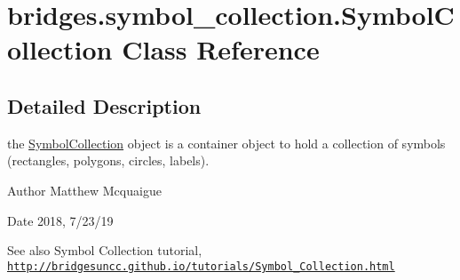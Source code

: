 \hypertarget{classbridges_1_1symbol__collection_1_1_symbol_collection}{}\section{bridges.\+symbol\+\_\+collection.\+Symbol\+Collection Class Reference}
\label{classbridges_1_1symbol__collection_1_1_symbol_collection}


\subsection{Detailed Description}
the \mbox{\hyperlink{classbridges_1_1symbol__collection_1_1_symbol_collection}{Symbol\+Collection}} object is a container object to hold a collection of symbols (rectangles, polygons, circles, labels). 

\begin{DoxyAuthor}{Author}
Matthew Mcquaigue
\end{DoxyAuthor}
\begin{DoxyDate}{Date}
2018, 7/23/19
\end{DoxyDate}
\begin{DoxySeeAlso}{See also}
Symbol Collection tutorial, \href{http://bridgesuncc.github.io/tutorials/Symbol_Collection.html}{\tt http\+://bridgesuncc.\+github.\+io/tutorials/\+Symbol\+\_\+\+Collection.\+html} 
\end{DoxySeeAlso}

